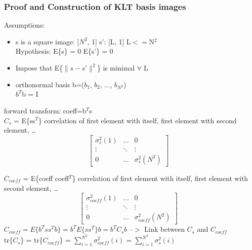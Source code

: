 \documentclass{article}
\begin{document}
\subsubsection{Proof and Construction of KLT basis images}
Assumptions:
\begin{itemize}
    \item s is a square image: [$N^2$, 1] \quad s': [L, 1] \quad L$<=$N$^2$ \\
    Hypothesis: E\{s\} = 0 \quad E\{s'\} = 0
    \item Impose that E\{$\lVert s - s' \rVert^2$\} is minimal $\forall$ L
    \item orthonormal basis b=($b_1$, $b_2$, ..., $b_{N^2}$)\\
    $b^T$b = I
\end{itemize}
forward transform: coeff=b$^T$s \\
$C_s$ = E\{ss$^T$\} correlation of first element with itself, first element with second element, \dots \\
\begin{equation}
    \begin{bmatrix}
        \sigma_s^2(1) & \dots & 0 \\
        \vdots & \ddots & \vdots \\
        0 & \dots & \sigma_s^2(N^2)
    \end{bmatrix}
\end{equation}


$C_{coeff}$ = E\{coeff coeff$^T$\} correlation of first element with itself, first element with second element, \dots \\
\begin{equation}
    \begin{bmatrix}
        \sigma_{coeff}^2(1) & \dots & 0 \\
        \vdots & \ddots & \vdots \\
        0 & \dots & \sigma_{coeff}^2(N^2)
    \end{bmatrix}
\end{equation}
$C_{coeff} = E\{b^Tss^Tb\} = b^TE\{ss^T\}b = b^TC_sb$ --$>$ Link between $C_s$ and $C_{coeff}$ \\
tr\{$C_s$\} = tr\{$C_{coeff}$\} = $\sum_{i=1}^{N^2}\sigma_{coeff}^2(i)$ = $\sum_{i=1}^{N^2}\sigma_s^2(i)$ \\
\end{document}
